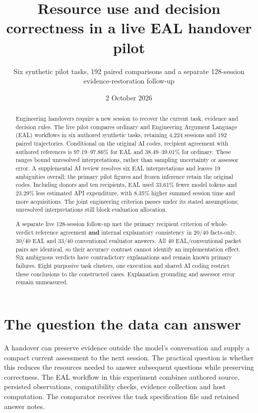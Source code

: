 \documentclass[
  11pt,
]{article}
\title{Resource use and decision correctness in a live EAL handover
pilot}
\subtitle{Six synthetic pilot tasks, 192 paired comparisons and a
separate 128-session evidence-restoration follow-up}
\author{}
\date{2 October 2026}
\begin{document}
\maketitle

\begin{abstract}

Engineering handovers require a new session to recover the current task,
evidence and decision rules. The live pilot compares ordinary and
Engineering Argument Language (EAL) workflows in six authored synthetic
tasks, retaining 4,224 sessions and 192 paired trajectories. Conditional
on the original AI codes, recipient agreement with authored references
is 97.19--97.86\% for EAL and 38.49--39.01\% for ordinary. These ranges
bound unresolved interpretations, rather than sampling uncertainty or
assessor error. A supplemental AI review resolves six EAL
interpretations and leaves 19 ambiguities overall; the primary pilot
figures and frozen inference retain the original codes. Including donors
and ten recipients, EAL used 33.61\% fewer model tokens and 23.29\% less
estimated API expenditure, with 8.35\% higher summed session time and
more acquisitions. The joint engineering criterion passes under its
stated assumptions; unresolved interpretations still block evaluation
allocation.

A separate live 128-session follow-up met the primary recipient
criterion of whole-verdict reference agreement \textbf{and} internal
explanatory consistency in 20/40 facts-only, 30/40 EAL and 33/40
conventional evaluator answers. All 40 EAL/conventional packet pairs are
identical, so their accuracy contrast cannot identify an implementation
effect. Six ambiguous verdicts have contradictory explanations and
remain known primary failures. Eight purposive task clusters, one
execution and shared AI coding restrict these conclusions to the
constructed cases. Explanation grounding and assessor error remain
unmeasured.

\end{abstract}

\FloatBarrier

\hypertarget{the-question-the-data-can-answer}{%
\section{The question the data can
answer}\label{the-question-the-data-can-answer}}

A handover can preserve evidence outside the model's conversation and
supply a compact current assessment to the next session. The practical
question is whether this reduces the resources needed to answer
subsequent questions while preserving correctness. The EAL workflow in
this experiment combines authored source, persisted observations,
compatibility checks, evidence collection and host computation. The
comparator receives the task specification file and retained answer
notes.
\end{document}
